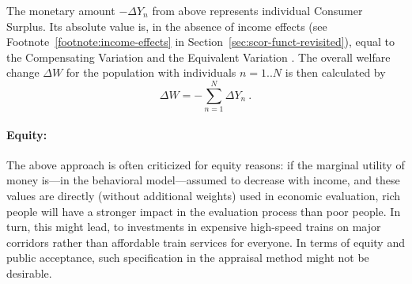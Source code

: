 
The monetary amount $ - \Delta Y_n$ from above represents individual Consumer Surplus. Its absolute value is, in the absence of income effects (see Footnote~\ref{footnote:income-effects} in Section~\ref{sec:scor-funct-revisited}), equal to the Compensating Variation and the Equivalent Variation \citep{DalyEtAl2008WelfareMeasuresIncome}.
%
The overall welfare change $\Delta W$ for the population with individuals $n=1..N$ is then calculated by
%
\begin{equation}
\label{eq:ch:economicEval:monetizationWtPAggregate}
\Delta W =  - \sum_{n=1}^N \Delta Y_n \ .
\end{equation}

\paragraph*{Equity:}

The above approach is often criticized for equity reasons: if the marginal utility of money is---in the behavioral model---assumed to decrease with income, and these values are directly (without additional weights) used in economic evaluation, rich people will have a stronger impact in the evaluation process than poor people. In turn, this might lead, \eg to investments in expensive high-speed trains on major corridors rather than affordable train services for everyone. In terms of equity and public acceptance, such specification in the appraisal method might not be desirable.

